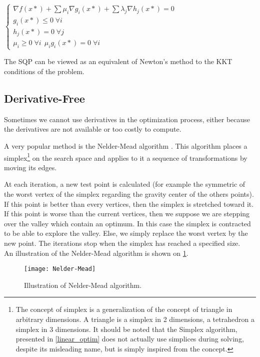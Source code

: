 $\left\{
 		 \begin{array}{l}
			\nabla f(x*) + \displaystyle\sum \mu_i \nabla g_i(x*) + \displaystyle\sum \lambda_j \nabla h_j(x*) = 0 \\
			g_i(x*) \leq 0 \;\forall i \\
			h_j(x*) = 0 \;\forall j \\
			\mu_i \geq 0 \;\forall i\	\
			\mu_ig_i(x*) = 0 \;\forall i
		\end{array}
	\right. $
	
The SQP can be viewed as an equivalent of Newton's method to the KKT conditions of the problem.

\subsection{Derivative-Free}

Sometimes we cannot use derivatives in the optimization process, either because the derivatives are not available or too costly to compute.

A very popular method is the Nelder-Mead algorithm \cite{Nelder01011965}. This algorithm places a simplex\footnote{The concept of simplex is a generalization of the concept of triangle in arbitrary dimensions. A triangle is a simplex in 2 dimensions, a tetrahedron a simplex in 3 dimensions. It should be noted that the Simplex algorithm, presented in \ref{linear_optim} does not actually use simplices during solving, despite its misleading name, but is simply inspired from the concept.} on the search space and applies to it a sequence of transformations by moving its edges.

At each iteration, a new test point is calculated (for example the symmetric of the worst vertex of the simplex regarding the gravity center of the others points). If this point is better than every vertices, then the simplex is stretched toward it. If this point is worse than the current vertices, then we suppose we are stepping over the valley which contain an optimum. In this case the simplex is contracted to be able to explore the valley. Else, we simply replace the worst vertex by the new point. The iterations stop when the simplex has reached a specified size.\\
An illustration of the Nelder-Mead algorithm is shown on \figurename{} \ref{nelder-mead}.

\begin{figure}
\centering
\texttt{[image: Nelder-Mead]}
\caption{Illustration of Nelder-Mead algorithm.}\label{nelder-mead}
\end{figure}

